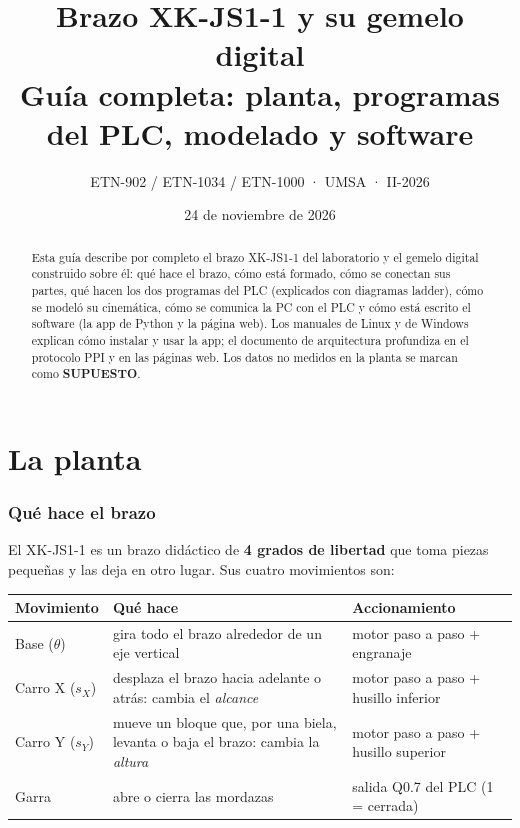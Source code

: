 \documentclass[a4paper,11pt]{article}
\title{\textbf{Brazo XK-JS1-1 y su gemelo digital}\\[4pt]\large Guía completa: planta, programas del PLC, modelado y software}
\author{ETN-902 / ETN-1034 / ETN-1000 · UMSA · II-2026}
\date{24 de noviembre de 2026}
\begin{document}
\maketitle
\thispagestyle{fancy}

\begin{abstract}
Esta guía describe por completo el brazo XK-JS1-1 del laboratorio y el gemelo digital construido sobre él: qué hace el brazo, cómo está formado, cómo se conectan sus partes, qué hacen los dos programas del PLC (explicados con diagramas ladder), cómo se modeló su cinemática, cómo se comunica la PC con el PLC y cómo está escrito el software (la app de Python y la página web). Los manuales de Linux y de Windows explican cómo instalar y usar la app; el documento de arquitectura profundiza en el protocolo PPI y en las páginas web. Los datos no medidos en la planta se marcan como \textbf{SUPUESTO}.
\end{abstract}

\tableofcontents
\newpage

\part{La planta}

\section{Qué hace el brazo}

El XK-JS1-1 es un brazo didáctico de \textbf{4 grados de libertad} que toma piezas pequeñas y las deja en otro lugar. Sus cuatro movimientos son:

\begin{center}\small
\begin{tabularx}{\linewidth}{>{\raggedright}p{2.6cm} >{\raggedright}X >{\raggedright\arraybackslash}p{4.6cm}}
\toprule
\textbf{Movimiento} & \textbf{Qué hace} & \textbf{Accionamiento}\\
\midrule
Base ($\theta$) & gira todo el brazo alrededor de un eje vertical & motor paso a paso + engranaje\\
Carro X ($s_X$) & desplaza el brazo hacia adelante o atrás: cambia el \emph{alcance} & motor paso a paso + husillo inferior\\
Carro Y ($s_Y$) & mueve un bloque que, por una biela, levanta o baja el brazo: cambia la \emph{altura} & motor paso a paso + husillo superior\\
Garra & abre o cierra las mordazas & salida Q0.7 del PLC (1 = cerrada)\\
\bottomrule
\end{tabularx}
\end{center}
\end{document}
